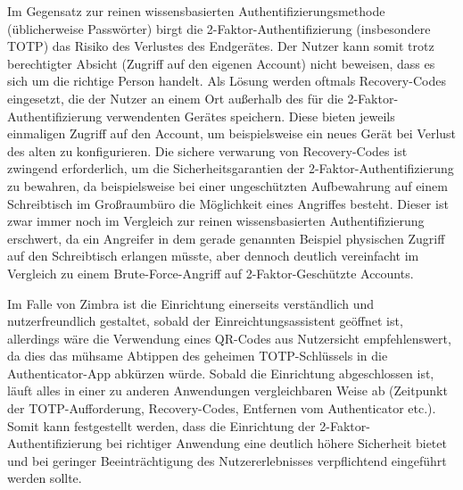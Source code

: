 \documentclass{article}
\begin{document}
Im Gegensatz zur reinen wissensbasierten Authentifizierungsmethode
(üblicherweise Passwörter) birgt die 2-Faktor-Authentifizierung (insbesondere
TOTP) das Risiko des Verlustes des Endgerätes. Der Nutzer kann somit trotz
berechtigter Absicht (Zugriff auf den eigenen Account) nicht beweisen, dass es
sich um die richtige Person handelt. Als Lösung werden oftmals Recovery-Codes
eingesetzt, die der Nutzer an einem Ort außerhalb des für die
2-Faktor-Authentifizierung verwendenten Gerätes speichern. Diese bieten jeweils
einmaligen Zugriff auf den Account, um beispielsweise ein neues Gerät bei
Verlust des alten zu konfigurieren. Die sichere verwarung von Recovery-Codes
ist zwingend erforderlich, um die Sicherheitsgarantien der
2-Faktor-Authentifizierung zu bewahren, da beispielsweise bei einer
ungeschützten Aufbewahrung auf einem Schreibtisch im Großraumbüro die
Möglichkeit eines Angriffes besteht. Dieser ist zwar immer noch im Vergleich
zur reinen wissensbasierten Authentifizierung erschwert, da ein Angreifer in
dem gerade genannten Beispiel physischen Zugriff auf den Schreibtisch
erlangen müsste, aber dennoch deutlich vereinfacht im Vergleich zu einem
Brute-Force-Angriff auf 2-Faktor-Geschützte Accounts.

Im Falle von Zimbra ist die Einrichtung einerseits verständlich und
nutzerfreundlich gestaltet, sobald der Einreichtungsassistent geöffnet ist,
allerdings wäre die Verwendung eines QR-Codes aus Nutzersicht empfehlenswert,
da dies das mühsame Abtippen des geheimen TOTP-Schlüssels in die
Authenticator-App abkürzen würde. Sobald die Einrichtung abgeschlossen ist,
läuft alles in einer zu anderen Anwendungen vergleichbaren Weise ab (Zeitpunkt der
TOTP-Aufforderung, Recovery-Codes, Entfernen vom Authenticator etc.). Somit
kann festgestellt werden, dass die Einrichtung der 2-Faktor-Authentifizierung
bei richtiger Anwendung eine deutlich höhere Sicherheit bietet und bei
geringer Beeinträchtigung des Nutzererlebnisses verpflichtend eingeführt werden
sollte.
\end{document}
